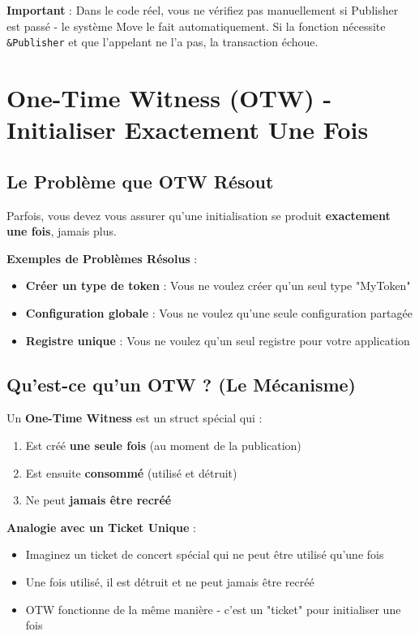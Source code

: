\documentclass[11pt]{article}
\begin{document}
\begin{noteBox}
\textbf{Important} : Dans le code réel, vous ne vérifiez pas manuellement si Publisher est passé - le système Move le fait automatiquement. Si la fonction nécessite \texttt{\&Publisher} et que l'appelant ne l'a pas, la transaction échoue.
\end{noteBox}

\section{One-Time Witness (OTW) - Initialiser Exactement Une Fois}

\subsection{Le Problème que OTW Résout}

Parfois, vous devez vous assurer qu'une initialisation se produit \textbf{exactement une fois}, jamais plus.

\begin{explainBox}
\textbf{Exemples de Problèmes Résolus} :
\begin{itemize}
  \item \textbf{Créer un type de token} : Vous ne voulez créer qu'un seul type "MyToken"
  \item \textbf{Configuration globale} : Vous ne voulez qu'une seule configuration partagée
  \item \textbf{Registre unique} : Vous ne voulez qu'un seul registre pour votre application
\end{itemize}
\end{explainBox}

\subsection{Qu'est-ce qu'un OTW ? (Le Mécanisme)}

Un \textbf{One-Time Witness} est un struct spécial qui :
\begin{enumerate}
  \item Est créé \textbf{une seule fois} (au moment de la publication)
  \item Est ensuite \textbf{consommé} (utilisé et détruit)
  \item Ne peut \textbf{jamais être recréé}
\end{enumerate}

\begin{explainBox}
\textbf{Analogie avec un Ticket Unique} :
\begin{itemize}
  \item Imaginez un ticket de concert spécial qui ne peut être utilisé qu'une fois
  \item Une fois utilisé, il est détruit et ne peut jamais être recréé
  \item OTW fonctionne de la même manière - c'est un "ticket" pour initialiser une fois
\end{itemize}
\end{explainBox}
\end{document}
